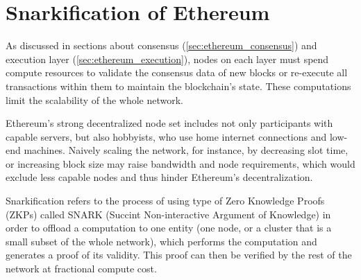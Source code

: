 \chapter{Snarkification of Ethereum}\label{chapter:snarkification}

As discussed in sections about consensus (\ref{sec:ethereum_consensus}) and
execution layer (\ref{sec:ethereum_execution}), nodes on each layer must spend
compute resources to validate the consensus data of new blocks or re-execute all
transactions within them to maintain the blockchain's state.
These computations limit the scalability of the whole network.

Ethereum's strong
decentralized node set includes not only participants with capable servers,
but also hobbyists, who use home internet connections and low-end machines.
Naively scaling the network, for instance, by decreasing slot time, or increasing
block size may raise bandwidth and node requirements, which would exclude
less capable nodes and thus hinder Ethereum's decentralization.

Snarkification refers to the process of using type of Zero Knowledge Proofs (ZKPs)
called SNARK (Succint Non-interactive Argument of Knowledge) in order to offload
a computation to one entity (one node, or a cluster that is a small subset of
the whole network), which performs the computation and generates a proof of
its validity. This proof can then be verified by the rest of the network
at fractional compute cost.


